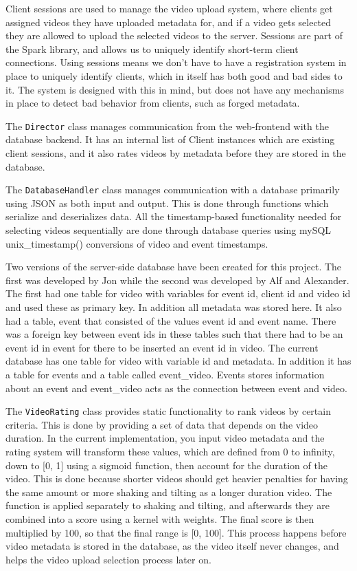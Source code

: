 \documentclass[conference]{IEEEtran}
\begin{document}
Client sessions are used to manage the video upload system, where clients get assigned videos they have uploaded
metadata for, and if a video gets selected they are allowed to upload the selected videos to the server.
Sessions are part of the Spark library, and allows us to uniquely identify short-term client connections. Using
sessions means we don't have to have a registration system in place to uniquely identify clients, which in itself
has both good and bad sides to it. The system is designed with this in mind, but does not have any mechanisms in
place to detect bad behavior from clients, such as forged metadata.

The \texttt{Director} class manages communication from the web-frontend with the database backend. It has an internal list
of Client instances which are existing client sessions, and it also rates videos by metadata before they are
stored in the database.

The \texttt{DatabaseHandler} class manages communication with a database primarily using JSON as both input and output.
This is done through functions which serialize and deserializes data. All the timestamp-based functionality needed
for selecting videos sequentially are done through database queries using mySQL unix\_timestamp() conversions of
video and event timestamps.

Two versions of the server-side database have been created for this project. The first was developed by Jon while the 
second was developed by Alf and Alexander. The first had one table for video with variables for event id, client id 
and video id and used these as primary key. In addition all metadata was stored here. It also had a table, event that 
consisted of the values event id and event name. There was a foreign key between event ids in these tables such that there 
had to be an event id in event for there to be inserted an event id in video.
The current database has one table for video with variable id and metadata. In addition it has a table for events and a table 
called event\_video. Events stores information about an event and event\_video acts as the connection between event and video.

The \texttt{VideoRating} class provides static functionality to rank videos by certain criteria. This is done by providing
a set of data that depends on the video duration. In the current implementation, you input video metadata and the
rating system will transform these values, which are defined from 0 to infinity, down to [0, 1] using a sigmoid function,
then account for the duration of the video. This is done because shorter videos should get heavier penalties for
having the same amount or more shaking and tilting as a longer duration video. The function is applied separately to
shaking and tilting, and afterwards they are combined into a score using a kernel with weights. The final score is
then multiplied by 100, so that the final range is [0, 100]. This process happens before video metadata is stored
in the database, as the video itself never changes, and helps the video upload selection process later on.
\end{document}
